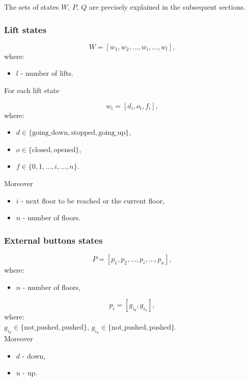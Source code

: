 \documentclass[12pt]{article}
\begin{document}
The sets of states $W$, $P$, $Q$ are precisely explained in the subsequent sections.

\subsubsection{Lift states}

\[ W=[w_1, w_2, ..., w_i, ..., w_l ],\]
where:
\begin{itemize}
  \item[] \(l\) - number of lifts.
\end{itemize}

For each lift state

\[ w_i = [d_i, o_i, f_i], \]
where:

\begin{itemize}
\item[] \(d \in \{\text{going\_down},\text{stopped},\text{going\_up}\}\),

\item[] \(o \in \{\text{closed},\text{opened}\}\),

\item[] \(f \in \{0,1,...,i,...,n\}\).
\end{itemize}

Moreover

\begin{itemize}
  \item[] \(i\) - next floor to be reached or the current floor,
  \item[] \(n\) - number of floors.
\end{itemize}


\subsubsection{External buttons states}

\[ P = [p_1, p_2, ..., p_i, ..., p_n], \]
where:
\begin{itemize}
  \item[] \(n\) - number of floors,
\end{itemize}

\[ p_i = [g_{i_d}, g_{i_u}], \]
where:\\
\(g_{i_d} \in \{\text{not\_pushed},\text{pushed}\}\),
\(g_{i_u} \in \{\text{not\_pushed},\text{pushed}\}\).\\

Moreover

\begin{itemize}
  \item[] \(d\) - down,
  \item[] \(u\) - up.
\end{itemize}
\end{document}
